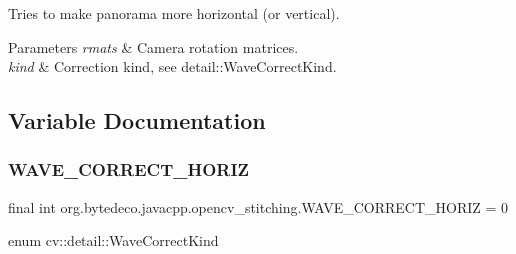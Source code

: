 Tries to make panorama more horizontal (or vertical). 


\begin{DoxyParams}{Parameters}
{\em rmats} & Camera rotation matrices. \\
\hline
{\em kind} & Correction kind, see detail\+::\+Wave\+Correct\+Kind. \\
\hline
\end{DoxyParams}


\subsection{Variable Documentation}
\mbox{\label{group__stitching__rotation_ga5b86272961257cad2cfb216bf6ca414b}} 
\subsubsection{\texorpdfstring{W\+A\+V\+E\+\_\+\+C\+O\+R\+R\+E\+C\+T\+\_\+\+H\+O\+R\+IZ}{WAVE\_CORRECT\_HORIZ}}
{\footnotesize\ttfamily final int org.\+bytedeco.\+javacpp.\+opencv\+\_\+stitching.\+W\+A\+V\+E\+\_\+\+C\+O\+R\+R\+E\+C\+T\+\_\+\+H\+O\+R\+IZ = 0\hspace{0.3cm}{\ttfamily [static]}}

enum cv\+::detail\+::\+Wave\+Correct\+Kind 